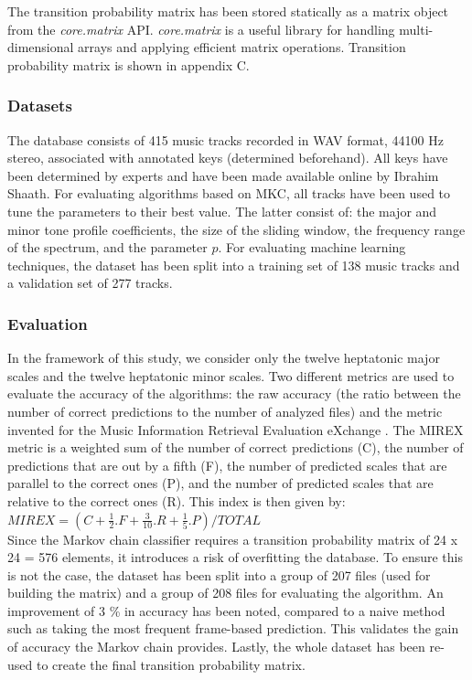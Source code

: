 \documentclass[letterpaper]{article}
\begin{document}
The transition probability matrix has been stored statically as a matrix object from the \textit{core.matrix} API. \textit{core.matrix} is a useful library for handling multi-dimensional arrays and applying efficient matrix operations. Transition probability matrix is shown in appendix C.

\subsubsection{Datasets}

The database consists of 415 music tracks recorded in WAV format, 44100 Hz stereo, associated with annotated keys (determined beforehand).
All keys have been determined
by experts and have been made available online by Ibrahim Sha\textquotesingle ath. For evaluating algorithms based on MKC,
all tracks have been used to tune the parameters to their best value. The latter consist of: the major and minor tone profile coefficients,
the size of the sliding window, the frequency range of the spectrum, and the parameter $p$. For evaluating machine learning techniques,
the dataset has been split into a training set of 138 music tracks and a validation set of 277 tracks.

\subsubsection{Evaluation}

In the framework of this study, we consider only the twelve heptatonic major scales and the twelve heptatonic minor scales.
Two different metrics are used to evaluate the accuracy of the algorithms:
the raw accuracy (the ratio between the number of correct predictions to the number of analyzed files) and the metric invented for the Music Information Retrieval Evaluation eXchange \citep{MIREX}.
The MIREX metric is a weighted sum of the number of correct predictions (C), the number of predictions that are out by a fifth (F), the number of predicted scales that are parallel to the correct ones (P), and the number of predicted scales
that are relative to the correct ones (R). This index is then given by: \\

\noindent $ MIREX = (C + \frac{1}{2}.F + \frac{3}{10}.R + \frac{1}{5}.P) / TOTAL $ \\

Since the Markov chain classifier requires a transition probability matrix of 24 x 24 = 576 elements, it introduces a risk of overfitting the database. To ensure this is not the case, the dataset has been split into a group of 207 files (used for building the matrix) and a group of 208 files for evaluating the algorithm. An improvement of 3 \% in accuracy has been noted, compared to a naive method such as taking the most frequent frame-based prediction. This validates the gain of accuracy the Markov chain provides. Lastly, the whole dataset has been re-used to create the final transition probability matrix.
\end{document}
